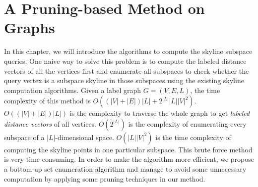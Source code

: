 
%
%

\chapter{A Pruning-based Method on Graphs}
\label{ch:graph}

In this chapter, we will introduce the algorithms to compute the skyline subspace queries. One naive way to solve this problem is to compute the labeled distance vectors of all the vertices first and enumerate all subspaces to check whether the query vertex is a subspace skyline in those subspaces using the existing skyline computation algorithms. Given a label graph $G=(V, E, L)$, the time complexity of this method is $O((|V|+|E|)|L| + 2^{|L|}|L||V|^2)$. $O((|V|+|E|)|L|)$ is the complexity to traverse the whole graph to get \emph{labeled distance vectors} of all vertices. $O(2^{|L|})$ is the complexity of enumerating every subspace of a $|L|$-dimensional space. $O(|L||V|^2)$ is the time complexity of computing the skyline points in one particular subspace. This brute force method is very time consuming. In order to make the algorithm more efficient, we propose a bottom-up set enumeration algorithm and manage to avoid some unnecessary computation by applying some pruning techniques in our method.

